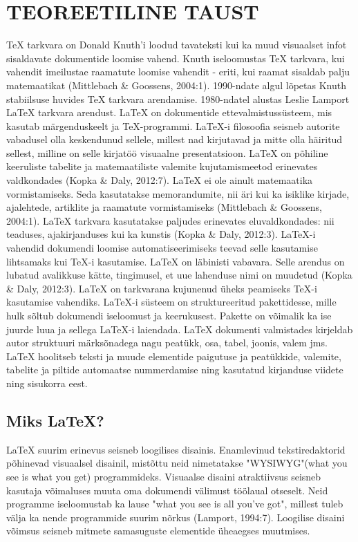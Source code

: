 \documentclass{21kuur}
\begin{document}
\chapter{TEOREETILINE TAUST}
TeX tarkvara on Donald Knuth'i loodud tavateksti kui ka muud visuaalset infot sisaldavate dokumentide loomise vahend. Knuth iseloomustas TeX tarkvara, kui vahendit imeilustae raamatute loomise vahendit - eriti, kui raamat sisaldab palju matemaatikat (Mittlebach \& Goossens, 2004:1). 1990-ndate algul l\~{o}petas Knuth stabiilsuse huvides TeX tarkvara arendamise. 1980-ndatel alustas Leslie Lamport LaTeX tarkvara arendust. LaTeX on dokumentide ettevalmistuss\"{u}steem, mis kasutab m\"{a}rgenduskeelt ja TeX-programmi. LaTeX-i filosoofia seisneb autorite vabadusel olla keskendunud sellele, millest nad kirjutavad ja mitte olla h\"{a}iritud sellest, milline on selle kirjat\"{o}\"{o} visuaalne presentatsioon. LaTeX on p\~{o}hiline keeruliste tabelite ja matemaatiliste valemite kujutamismeetod erinevates valdkondades (Kopka \& Daly, 2012:7). LaTeX ei ole ainult matemaatika vormistamiseks. Seda kasutatakse memorandumite, nii \"{a}ri kui ka isiklike kirjade, ajalehtede, artiklite ja raamatute vormistamiseks (Mittlebach \& Goossens, 2004:1). LaTeX tarkvara kasutatakse paljudes erinevates eluvaldkondades: nii teaduses, ajakirjanduses kui ka kunstis (Kopka \& Daly, 2012:3). LaTeX-i vahendid dokumendi loomise automatiseerimiseks teevad selle kasutamise lihtsamaks kui TeX-i kasutamise. LaTeX on l\"{a}binisti vabavara. Selle arendus on lubatud avalikkuse k\"{a}tte, tingimusel, et uue lahenduse nimi on muudetud (Kopka \& Daly, 2012:3). LaTeX on tarkvarana kujunenud \"{u}heks peamiseks TeX-i kasutamise vahendiks. 
LaTeX-i s\"{u}steem on struktureeritud pakettidesse, mille hulk s\~{o}ltub dokumendi iseloomust ja keerukusest. Pakette on v\~{o}imalik ka ise juurde luua ja sellega LaTeX-i laiendada. LaTeX dokumenti valmistades kirjeldab autor struktuuri m\"{a}rks\~{o}nadega nagu peat\"{u}kk, osa, tabel, joonis, valem jms. LaTeX hoolitseb teksti ja muude elementide paigutuse ja peat\"{u}kkide, valemite, tabelite ja piltide automaatse nummerdamise ning kasutatud kirjanduse viidete ning sisukorra eest.

\section{Miks LaTeX?}
LaTeX suurim erinevus seisneb loogilises disainis. Enamlevinud tekstiredaktorid p\~{o}hinevad visuaalsel disainil, mist\~{o}ttu neid nimetatakse "WYSIWYG"(what you see is what you get) programmideks. Visuaalse disaini atraktiivsus seisneb kasutaja v\~{o}imaluses muuta oma dokumendi v\"{a}limust t\"{o}\"{o}laual otseselt. Neid programme iseloomustab ka lause "what you see is all you've got", millest tuleb v\"{a}lja ka nende programmide suurim n\~{o}rkus (Lamport, 1994:7). Loogilise disaini v\~{o}imsus seisneb mitmete samasuguste elementide \"{u}heaegses muutmises.
\end{document}
